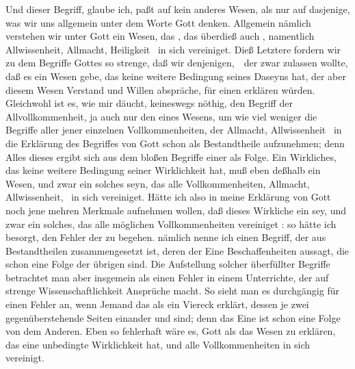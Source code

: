 \begin{aufza}
\item Und dieser Begriff, glaube ich, paßt auf kein anderes Wesen, als nur auf dasjenige, was wir uns allgemein unter dem Worte Gott denken. Allgemein nämlich verstehen wir unter Gott ein Wesen, das , das überdieß auch , namentlich Allwissenheit, Allmacht, Heiligkeit \usw\ in sich vereiniget. Dieß Letztere fordern wir zu dem Begriffe Gottes so strenge, daß wir denjenigen,~\ der zwar zulassen wollte, daß es ein Wesen gebe, das keine weitere Bedingung seines Daseyns hat, der aber diesem Wesen Verstand und Willen abspräche, für einen  erklären würden. Gleichwohl ist es, wie mir däucht, keineswegs nöthig, den Begriff der Allvollkommenheit, ja auch nur den eines Wesens, um wie viel weniger die Begriffe aller jener einzelnen Vollkommenheiten, der Allmacht, Allwissenheit \usw\ in die Erklärung des Begriffes von Gott schon als Bestandtheile aufzunehmen; denn Alles dieses ergibt sich aus dem bloßen Begriffe einer  als Folge. Ein Wirkliches, das keine weitere Bedingung seiner Wirklichkeit hat, muß eben deßhalb ein Wesen, und zwar ein solches seyn, das alle Vollkommenheiten, Allmacht, Allwissenheit, \usw\ in sich vereiniget. Hätte ich also in meine Erklärung von Gott noch jene mehren Merkmale aufnehmen wollen, daß dieses Wirkliche ein  sey, und zwar ein solches, das alle möglichen Vollkommenheiten vereiniget \usw : so hätte ich besorgt, den Fehler der  zu begehen.  nämlich nenne ich einen Begriff, der aus Bestandtheilen zusammengesetzt ist, deren der Eine Beschaffenheiten aussagt, die schon eine Folge der übrigen sind. Die Aufstellung solcher überfüllter Begriffe betrachtet man aber insgemein als einen Fehler in einem Unterrichte, der auf strenge Wissenschaftlichkeit Ansprüche macht. So sieht man es durchgängig für einen Fehler an, wenn Jemand das  als ein Viereck erklärt, dessen je zwei gegenüberstehende Seiten einander  und  sind; denn das Eine ist schon eine Folge von dem Anderen. Eben so fehlerhaft wäre es, Gott als das Wesen zu erklären, das eine unbedingte Wirklichkeit hat, und alle Vollkommenheiten in sich vereinigt.


\end{aufza}
